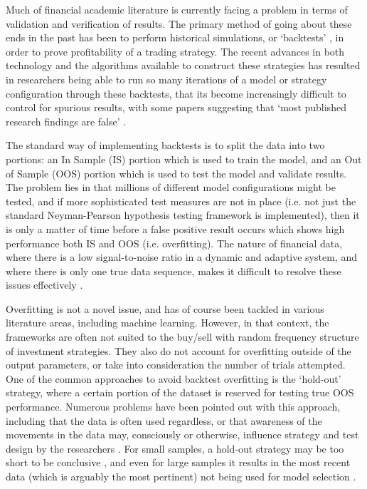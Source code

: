 \documentclass[a4paper,11pt,oneside]{article}
\theoremstyle{plain}
\theoremstyle{definition}
\begin{document}
Much of financial academic literature is currently facing a problem in terms of validation and verification of results. 
The primary method of going about these ends in the past has been to perform historical simulations, or ‘backtests’ ,
in order to prove profitability of a trading strategy. The recent advances in both technology and the algorithms available 
to construct these strategies has resulted in researchers being able to run so many iterations of a model or strategy
 configuration through these backtests, that its become increasingly difficult to control for spurious results, with some 
 papers suggesting that ‘most published research findings are false’   \cite{Ioannidis}.
\hfill \break 

The standard way of implementing backtests is to split the data into two portions: an In Sample (IS) portion which
 is used to train the model, and an Out of Sample (OOS) portion which is used to test the model and validate results. 
 The problem lies in that millions of different model configurations might be tested, and if more sophisticated test 
 measures are not in place (i.e. not just the standard Neyman-Pearson hypothesis testing framework is implemented), 
 then it is only a matter of time before a false positive result occurs which shows high performance both IS and OOS (i.e. overfitting). 
 The nature of financial data, where there is a low signal-to-noise ratio in a dynamic and adaptive system, and 
 where there is only one true data sequence, makes it difficult to resolve these issues effectively 
\cite{BailyPBO, McLean}.
\hfill \break 

Overfitting is not a novel issue, and has of course been tackled in various literature areas, including machine learning. 
However, in that context, the frameworks are often not suited to the buy/sell with random frequency structure of 
investment strategies. They also do not account for overfitting outside of the output parameters, or take into 
consideration the number of trials attempted. One of the common approaches to avoid backtest overfitting is the ‘hold-out’ strategy, where a certain portion of 
the dataset is reserved for testing true OOS performance. Numerous problems have been pointed out with this 
approach, including that the data is often used regardless, or that awareness of the movements in the data may, 
consciously or otherwise, influence strategy and test design by the researchers \cite{Schorfheide}. For small samples, 
a hold-out strategy may be too short to be conclusive \cite{Weiss}, and even for large samples it results in the 
most recent data (which is arguably the most pertinent) not being used for model selection \cite{Hawkins, BailyPBO}.
\hfill \break 
\end{document}
